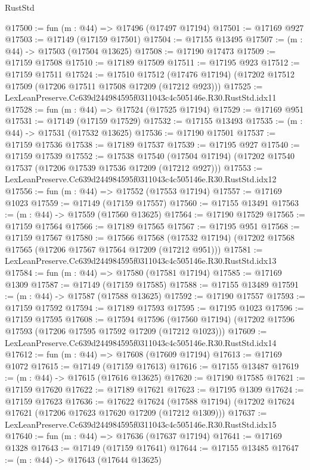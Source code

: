 \begin{lexlean}{RustStd}
\begin{coremodule}
@17500 := fun (m : @44) => @17496 (@17497 @17194)
@17501 := @17169 @927
@17503 := @17149 (@17159 @17501)
@17504 := @17155 @13495
@17507 := (m : @44) -> @17503 (@17504 @13625)
@17508 := @17190 @17473
@17509 := @17159 @17508
@17510 := @17189 @17509
@17511 := @17195 @923
@17512 := @17159 @17511
@17524 := @17510
    @17512
    (@17476 @17194)
    (@17202 @17512 @17509 (@17206 @17511 @17508 @17209 (@17212 @923)))
@17525 := LexLeanPreserve.Cc639d244984595f0311043c4c505146e.R30.RustStd.idx11
@17528 := fun (m : @44) => @17524 (@17525 @17194)
@17529 := @17169 @951
@17531 := @17149 (@17159 @17529)
@17532 := @17155 @13493
@17535 := (m : @44) -> @17531 (@17532 @13625)
@17536 := @17190 @17501
@17537 := @17159 @17536
@17538 := @17189 @17537
@17539 := @17195 @927
@17540 := @17159 @17539
@17552 := @17538
    @17540
    (@17504 @17194)
    (@17202 @17540 @17537 (@17206 @17539 @17536 @17209 (@17212 @927)))
@17553 := LexLeanPreserve.Cc639d244984595f0311043c4c505146e.R30.RustStd.idx12
@17556 := fun (m : @44) => @17552 (@17553 @17194)
@17557 := @17169 @1023
@17559 := @17149 (@17159 @17557)
@17560 := @17155 @13491
@17563 := (m : @44) -> @17559 (@17560 @13625)
@17564 := @17190 @17529
@17565 := @17159 @17564
@17566 := @17189 @17565
@17567 := @17195 @951
@17568 := @17159 @17567
@17580 := @17566
    @17568
    (@17532 @17194)
    (@17202 @17568 @17565 (@17206 @17567 @17564 @17209 (@17212 @951)))
@17581 := LexLeanPreserve.Cc639d244984595f0311043c4c505146e.R30.RustStd.idx13
@17584 := fun (m : @44) => @17580 (@17581 @17194)
@17585 := @17169 @1309
@17587 := @17149 (@17159 @17585)
@17588 := @17155 @13489
@17591 := (m : @44) -> @17587 (@17588 @13625)
@17592 := @17190 @17557
@17593 := @17159 @17592
@17594 := @17189 @17593
@17595 := @17195 @1023
@17596 := @17159 @17595
@17608 := @17594
    @17596
    (@17560 @17194)
    (@17202 @17596 @17593 (@17206 @17595 @17592 @17209 (@17212 @1023)))
@17609 := LexLeanPreserve.Cc639d244984595f0311043c4c505146e.R30.RustStd.idx14
@17612 := fun (m : @44) => @17608 (@17609 @17194)
@17613 := @17169 @1072
@17615 := @17149 (@17159 @17613)
@17616 := @17155 @13487
@17619 := (m : @44) -> @17615 (@17616 @13625)
@17620 := @17190 @17585
@17621 := @17159 @17620
@17622 := @17189 @17621
@17623 := @17195 @1309
@17624 := @17159 @17623
@17636 := @17622
    @17624
    (@17588 @17194)
    (@17202 @17624 @17621 (@17206 @17623 @17620 @17209 (@17212 @1309)))
@17637 := LexLeanPreserve.Cc639d244984595f0311043c4c505146e.R30.RustStd.idx15
@17640 := fun (m : @44) => @17636 (@17637 @17194)
@17641 := @17169 @1328
@17643 := @17149 (@17159 @17641)
@17644 := @17155 @13485
@17647 := (m : @44) -> @17643 (@17644 @13625)

\end{coremodule}
\end{lexlean}
